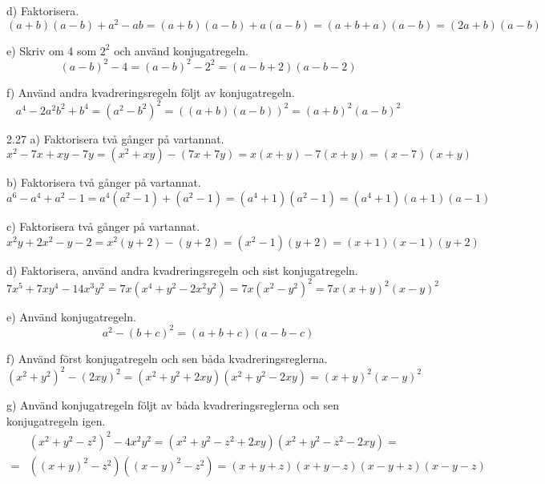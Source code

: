 \begin{task}{d)}
	Faktorisera.
	\[(a+b)(a-b)+a^2-ab=(a+b)(a-b)+a(a-b)=(a+b+a)(a-b)=(2a+b)(a-b)\]
\end{task}

\begin{task}{e)}
	Skriv om 4 som $2^2$ och använd konjugatregeln.
	\[(a-b)^2-4=(a-b)^2-2^2=(a-b+2)(a-b-2)\]
\end{task}

\begin{task}{f)}
	Använd andra kvadreringsregeln följt av konjugatregeln.
	\[a^4-2a^2b^2+b^4=(a^2-b^2)^2=((a+b)(a-b))^2=(a+b)^2(a-b)^2\]
\end{task}

\begin{task}{2.27 a)}
	Faktorisera två gånger på vartannat.
	\[x^2-7x+xy-7y=(x^2+xy)-(7x+7y)=x(x+y)-7(x+y)=(x-7)(x+y)\]
\end{task}

\begin{task}{b)}
	Faktorisera två gånger på vartannat.
	\[a^6-a^4+a^2-1=a^4(a^2-1)+(a^2-1)=(a^4+1)(a^2-1)=(a^4+1)(a+1)(a-1)\]
\end{task}

\begin{task}{c)}
	Faktorisera två gånger på vartannat.
	\[x^2y+2x^2-y-2=x^2(y+2)-(y+2)=(x^2-1)(y+2)=(x+1)(x-1)(y+2)\]
\end{task}

\begin{task}{d)}
	Faktorisera, använd andra kvadreringsregeln och sist konjugatregeln.
	\[7x^5+7xy^4-14x^3y^2=7x(x^4+y^2-2x^2y^2)=7x(x^2-y^2)^2=7x(x+y)^2(x-y)^2\]
\end{task}

\begin{task}{e)}
	Använd konjugatregeln.
	\[a^2-(b+c)^2=(a+b+c)(a-b-c)\]
\end{task}

\begin{task}{f)}
	Använd först konjugatregeln och sen båda kvadreringsreglerna.
	\[(x^2+y^2)^2-(2xy)^2=(x^2+y^2+2xy)(x^2+y^2-2xy)=(x+y)^2(x-y)^2\]
\end{task}

\begin{task}{g)}
	Använd konjugatregeln följt av båda kvadreringsreglerna och sen konjugatregeln igen.
	\begin{align*}
	&(x^2+y^2-z^2)^2-4x^2y^2=
	(x^2+y^2-z^2+2xy)(x^2+y^2-z^2-2xy)= \\ =
	&((x+y)^2-z^2)((x-y)^2-z^2)=
	(x+y+z)(x+y-z)(x-y+z)(x-y-z)
	\end{align*}
\end{task}

